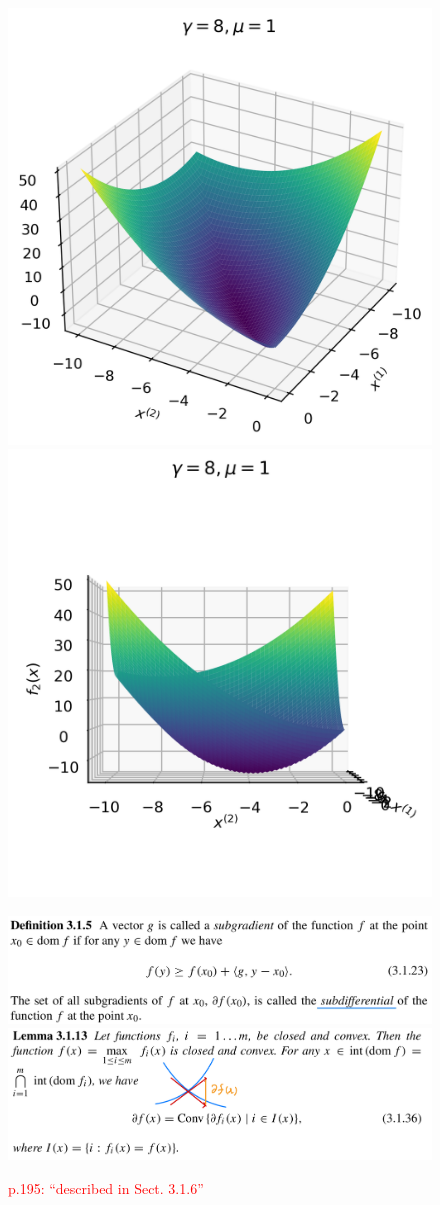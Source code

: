 \documentclass[a4paper, 14pt, dvipdfmx]{extarticle}
\newcommand{\red}[1]{\textcolor{red}{#1}}
\begin{document}
\begin{figure}[H]
    \begin{minipage}{0.49\columnwidth}
        \centering
        \includegraphics[width=0.6\columnwidth]{fk_2_1.png}
    \end{minipage}
    \begin{minipage}{0.49\columnwidth}
        \centering
        \includegraphics[width=0.6\columnwidth]{fk_2_2.png}
    \end{minipage}
\end{figure}

\begin{figure}[H]
    \centering
    \includegraphics[width=\columnwidth]{def315.jpg}
    \includegraphics[width=\columnwidth]{lem3113.png}
    \caption{\red{p.195: ``described in Sect. 3.1.6''}}
\end{figure}
\end{document}
